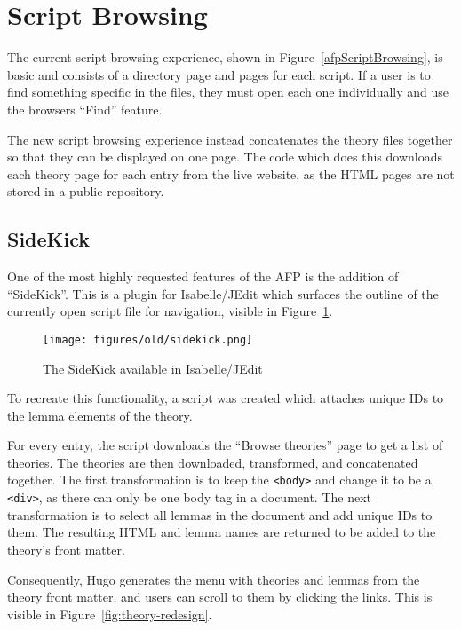 \documentclass[bsc,frontabs,oneside,singlespacing,parskip,deptreport,logo]{infthesis}
\begin{document}
\section{Script Browsing} \label{script-browsing}

The current script browsing experience, shown in Figure~\ref{afpScriptBrowsing}, is basic and consists of a directory page and pages for each script. If a user is to find something specific in the files, they must open each one individually and use the browsers ``Find'' feature.

The new script browsing experience instead concatenates the theory files together so that they can be displayed on one page. The code which does this downloads each theory page for each entry from the live website, as the HTML pages are not stored in a public repository.

\subsection{SideKick} \label{SideKick}



One of the most highly requested features of the AFP is the addition of ``SideKick''. This is a plugin for Isabelle/JEdit which surfaces the outline of the currently open script file for navigation, visible in Figure~\ref{fig:sidekick}.

\begin{figure}[h]
    \centering
    \texttt{[image: figures/old/sidekick.png]}
    \caption{The SideKick available in Isabelle/JEdit}
    \label{fig:sidekick}
\end{figure}

To recreate this functionality, a script was created which attaches unique IDs to the lemma elements of the theory. 

For every entry, the script downloads the ``Browse theories'' page to get a list of theories. The theories are then downloaded, transformed, and concatenated together. The first transformation is to keep the \verb|<body>| and change it to be a \verb|<div>|, as there can only be one body tag in a document. The next transformation is to select all lemmas in the document and add unique IDs to them. The resulting HTML and lemma names are returned to be added to the theory's front matter.

Consequently, Hugo generates the menu with theories and lemmas from the theory front matter, and users can scroll to them by clicking the links. This is visible in Figure~\ref{fig:theory-redesign}.
\end{document}
